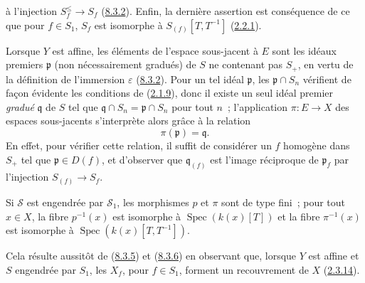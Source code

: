 à l'injection $S_f^{\leq}\to S_f$ (\hyperref[II.8.3.2-fr]{8.3.2}). Enfin, la
dernière assertion est conséquence de ce que pour $f\in S_1$, $S_f$ est
isomorphe à $S_{(f)}[T,T^{-1}]$ (\hyperref[II.2.2.1-fr]{2.2.1}).

\begin{remark}[8.3.7]
\label{II.8.3.7-fr}
Lorsque $Y$ est affine, les éléments de l'espace sous-jacent à $E$ sont les
idéaux premiers $\mathfrak{p}$ (non nécessairement gradués) de $S$ ne
contenant pas $S_+$, en vertu de la définition de l'immersion $\varepsilon$
(\hyperref[II.8.3.2-fr]{8.3.2}). Pour un tel idéal $\mathfrak{p}$, les
$\mathfrak{p}\cap S_n$ vérifient de façon évidente les conditions de
(\hyperref[II.2.1.9-fr]{2.1.9}), donc il existe un seul idéal premier
\emph{gradué} $\mathfrak{q}$ de $S$ tel que
$\mathfrak{q}\cap S_n=\mathfrak{p}\cap S_n$ pour tout $n$~; l'application
$\pi:E\to X$ des espaces sous-jacents s'interprète alors grâce à la relation
\begin{equation}
\label{II.8.3.7.1-fr}
  \pi(\mathfrak{p})=\mathfrak{q}.
\tag{8.3.7.1}
\end{equation}
En effet, pour vérifier cette relation, il suffit de considérer un $f$
homogène dans $S_+$ tel que $\mathfrak{p}\in D(f)$, et d'observer que
$\mathfrak{q}_{(f)}$ est l'image réciproque de $\mathfrak{p}_f$ par
l'injection $S_{(f)}\to S_f$.
\end{remark}

\begin{corollary}[8.3.8]
\label{II.8.3.8-fr}
Si $\mathcal{S}$ est engendrée par $\mathcal{S}_1$, les morphismes $p$ et
$\pi$ sont de type fini~; pour tout $x\in X$, la fibre $p^{-1}(x)$ est
isomorphe à $\operatorname{Spec}(k(x)[T])$ et la fibre $\pi^{-1}(x)$ est
isomorphe à $\operatorname{Spec}(k(x)[T,T^{-1}])$.
\end{corollary}

Cela résulte aussitôt de (\hyperref[II.8.3.5-fr]{8.3.5}) et
(\hyperref[II.8.3.6-fr]{8.3.6}) en observant que, lorsque $Y$ est affine et
$S$ engendrée par $S_1$, les $X_f$, pour $f\in S_1$, forment un recouvrement
de $X$ (\hyperref[II.2.3.14-fr]{2.3.14}).

